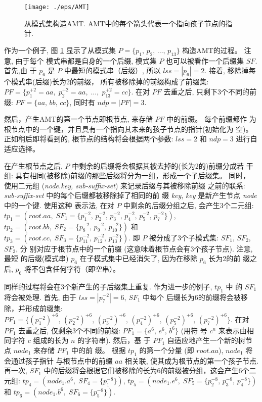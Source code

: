 \documentclass{ws-ijprai}
\begin{document}
\begin{figure}[htbp]
  \centering
  \texttt{[image: ./eps/AMT]}
  \caption{从模式集构造AMT. AMT中的每个箭头代表一个指向孩子节点的指针.}
  \label{fig:AMT}
\end{figure}

作为一个例子, 图 \ref{fig:AMT} 显示了从模式集
$P = \{p_1,\, p_2,\, \dots,\, p_{13}\}$ 构造AMT的过程。 注意, 由于每个
模式串都是自身的一个后缀, 模式集 $P$ 也可以被看作一个后缀集 $SF$. 首先,由
于 $p_6$ 是 $P$ 中最短的模式串（后缀）, 所以 $lss = |p_6| = 2$. 接着,
移除掉每个模式串(后缀)长为2的前缀， 所有被移除掉的前缀构成了前缀集:
$PF = \{p_1^{+2} = aa,\; p_2^{+2} = aa,\; \dots,\; p_{13}^{+2} =
cc\}$.  在对 $PF$ 去重之后, 只剩下3个不同的前缀: $PF = \{aa,\, bb,\,
cc\}$, 同时有 $ndp = |PF| = 3$.

然后，产生AMT的第一个节点即根节点, 来存储 $PF$ 中的前缀。 每个前缀都作
为根节点中的一个键，并且具有一个指向其未来的孩子节点的指针(初始化为
空)。 正如稍后即将看到的, 根节点的结构将会根据两个参数:
$lss=2$ 和 $ndp=3$ 进行自适应选择。

在产生根节点之后, $P$ 中剩余的后缀将会根据其被去掉的(长为2的)前缀分成若
干组: 具有相同(被移除)前缀的那些后缀将分为一组，形成一个子后缀集。 同时，
使用二元组 (\emph{node.key,\; sub-suffix-set}) 来记录后缀与其被移除前缀
之前的联系: \emph{sub-suffix-set} 中的每个后缀都被移除掉了相同的前
缀 \emph{key}, \emph{key} 是新产生节点 \emph{node} 中的一个键. 使用这种
表示法, 在对 $P$ 中剩余的后缀分组之后, 会产生3个二元组:
$tp_1 = (root.aa,\; SF_1=\{p_1^{-2},\, p_2^{-2},\, p_3^{-2},\,
p_4^{-2},\, p_5^{-2},\, p_7^{-2}\})$,\,
$tp_2 = (root.bb,\; SF_2=\{p_8^{-2},\, p_9^{-2},\,
p_{10}^{-2}\})$ 和
$tp_3 = (root.cc,\; SF_3=\{p_{11}^{-2},\, p_{12}^{-2},\,
p_{13}^{-2}\})$. 即 $P$ 被分成了3个子模式集: $SF_1$, $SF_2$, $SF_3$, 分
别对应于根节点中的一个前缀 (这意味着根节点会有3个孩子节点). 注意, 最短
的后缀(模式串) $p_6$ 在子模式集中已经消失了, 因为在移除 $p_6$ 长为2的前
缀之后, $p_6$ 将不包含任何字符（即空串）。

同样的过程将会在3个新产生的子后缀集上重复. 作为进一步的例子, $tp_1$ 中
的 $SF_1$ 将会被处理. 首先, 由于 $lss = |p_7^{-2}| = 6$, $SF_1$ 中每个
后缀长为6的前缀将会被移除，并形成前缀集:
$PF_1 = \{(p_1^{-2})^{+6},\, (p_2^{-2})^{+6},\, (p_3^{-2})^{+6},\,
(p_4^{-2})^{+6},\, (p_5^{-2})^{+6},\, (p_7^{-2})^{+6}\}$. 在对 $PF_1$
去重之后, 仅剩余3个不同的前缀: $PF_1 = \{a^6,\, e^6,\, b^6\}$ (用符
号 $c^n$ 来表示由相同字符 $c$ 组成的长为 $n$ 的字符串).  然后，基
于 $PF_1$ 自适应地产生一个新的树节点 $node_1$ 来存储 $PF_1$ 中的前
缀。 根据 $tp_1$ 的第一个分量 (即 $root.aa$), $node_1$ 将会通过孩子指针
与根节点中的前缀 $aa$ 相关联, 使其成为根节点的第一个孩子节点. 再一次,
$SF_1$ 中的后缀将会根据它们被移除的长为6的前缀被分组，这会产生6个二元组:
$tp_4 = (node_1.a^6,\; SF_4=\{p_1^{-8}\})$,
$tp_5 = (node_1.e^6,\; SF_5=\{p_2^{-8},\, p_3^{-8},\,
p_4^{-8}\})$ 和 $tp_6 = (node_1.b^6,\; SF_6=\{p_5^{-8}\})$.
\end{document}
